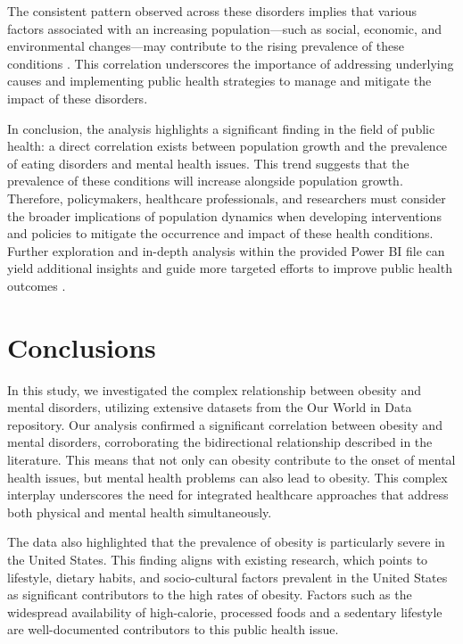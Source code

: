 \documentclass[runningheads]{llncs}
\begin{document}
The consistent pattern observed across these disorders implies that various factors associated with an increasing population—such as social, economic, and environmental changes—may contribute to the rising prevalence of these conditions \cite{jeatdisord2019}. This correlation underscores the importance of addressing underlying causes and implementing public health strategies to manage and mitigate the impact of these disorders.

In conclusion, the analysis highlights a significant finding in the field of public health: a direct correlation exists between population growth and the prevalence of eating disorders and mental health issues. This trend suggests that the prevalence of these conditions will increase alongside population growth. Therefore, policymakers, healthcare professionals, and researchers must consider the broader implications of population dynamics when developing interventions and policies to mitigate the occurrence and impact of these health conditions. Further exploration and in-depth analysis within the provided Power BI file can yield additional insights and guide more targeted efforts to improve public health outcomes \cite{jeatdisord2019,cambridge2020,bmjpsychiatry2020}.

\section{Conclusions}

In this study, we investigated the complex relationship between obesity and mental disorders, utilizing extensive datasets from the Our World in Data repository. Our analysis confirmed a significant correlation between obesity and mental disorders, corroborating the bidirectional relationship described in the literature. This means that not only can obesity contribute to the onset of mental health issues, but mental health problems can also lead to obesity. This complex interplay underscores the need for integrated healthcare approaches that address both physical and mental health simultaneously.

The data also highlighted that the prevalence of obesity is particularly severe in the United States. This finding aligns with existing research, which points to lifestyle, dietary habits, and socio-cultural factors prevalent in the United States as significant contributors to the high rates of obesity. Factors such as the widespread availability of high-calorie, processed foods and a sedentary lifestyle are well-documented contributors to this public health issue.
\end{document}
